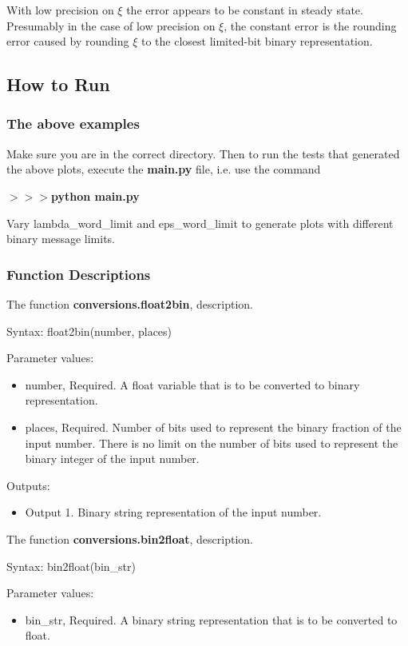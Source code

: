 \documentclass[12pt]{article}
\begin{document}
With low precision on $\xi$ the error appears to be constant in steady state. Presumably in the case of low precision on $\xi$, the constant error is the rounding error caused by rounding $\xi$ to the closest limited-bit binary representation.

\subsection*{How to Run}

\subsubsection*{The above examples}

Make sure you are in the correct directory. Then to run the tests that generated the above plots, execute the \textbf{main.py} file, i.e. use the command

\noindent \textbf{$>>>$python main.py}

Vary lambda\_word\_limit and eps\_word\_limit to generate plots with different binary message limits.

\subsubsection*{Function Descriptions}

The function \textbf{conversions.float2bin}, description.

Syntax: float2bin(number, places)

Parameter values:
\begin{itemize}
	\item number, Required. A float variable that is to be converted to binary representation.
	\item places, Required. Number of bits used to represent the binary fraction of the input number. There is no limit on the number of bits used to represent the binary integer of the input number.
\end{itemize}

Outputs:
\begin{itemize}
	\item Output 1. Binary string representation of the input number. 
\end{itemize}

\noindent The function \textbf{conversions.bin2float}, description.

Syntax: bin2float(bin\_str)

Parameter values:
\begin{itemize}
	\item bin\_str, Required. A binary string representation that is to be converted to float.
\end{itemize}
\end{document}
